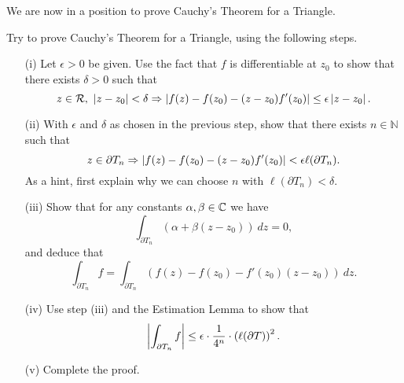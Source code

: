 We are now in a position to prove Cauchy's Theorem for a Triangle.
\begin{exercise}
Try to prove Cauchy's Theorem for a Triangle, using the following steps.
\begin{enumerate}
\item[(i)] Let $\epsilon >0$ be given.  Use the fact that $f$ is differentiable at $z_0$ to show that there exists $\delta >0$ such that 
\[ 
z \in \mathcal{R},\  \left| z-z_0 \right| < \delta \Rightarrow \left| f(z)-f(z_0)-(z-z_0)f'(z_0) \right| \leq \epsilon \left| z-z_0 \right|.
\]
\item[(ii)] With $\epsilon$ and $\delta$ as chosen in the previous step, show that there exists $n \in \mathbb{N}$ such that
\[
z \in \partial T_n \Rightarrow \left| f(z)-f(z_0)-(z-z_0)f'(z_0) \right| < \epsilon \ell( \partial T_n).
\]
As a hint, first explain why we can choose $n$ with $\ell ( \partial T_n) < \delta$.
\item[(iii)] Show that for any constants $\alpha,\beta \in \mathbb{C}$ we have
\[
\int_{\partial T_n} (\alpha + \beta (z-z_0) )\ dz = 0,
\]
and deduce that
\[
\int_{\partial T_n} f = \int_{\partial T_n} (f(z)-f(z_0)-f'(z_0)(z-z_0))\ dz.
\]
\item[(iv)] Use step (iii) and the Estimation Lemma to show that
\[
\left| \int_{\partial T_n} f  \right| \leq \epsilon \cdot \frac{1}{4^n} \cdot \left( \ell(\partial T)  \right)^2.
\]
\item[(v)] Complete the proof.
\end{enumerate}
\end{exercise}
